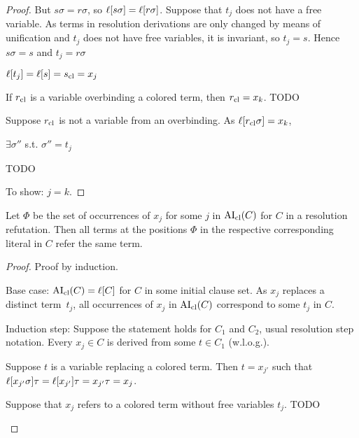\documentclass[,%
	paper=a4,%
	twoside=false,%
	liststotoc,
	bibtotoc,
	draft=false,%
	numbers=noendperiod
]{scrartcl}
\begin{document}
\begin{proof}
	But $s\sigma = r\sigma$, so $\ell[s\sigma] = \ell[r\sigma]$.
	Suppose that $t_j$ does not have a free variable.
	As terms in resolution derivations are only changed by means of unification and $t_j$ does not have free variables, it is invariant, so $t_j = s$.
	Hence $s\sigma = s$ and $t_j = r\sigma$

	$\ell[t_j] = \ell[s] = s_\mathrm{cl} = x_j$

	If $r_\mathrm{cl}$ is a variable overbinding a colored term, then $r_\mathrm{cl} = x_k$.  TODO

	Suppose $r_\mathrm{cl}$ is not a variable from an overbinding. As $\ell[r_\mathrm{cl} \sigma] = x_k$, 

	$\exists \sigma''$ s.t. $ \sigma'' = t_j$


	TODO

	To show: $j=k$.
\end{proof}

\begin{prop}
	Let $\Phi$ be the set of occurrences of $x_j$ for some $j$ in $\operatorname{AI}_\mathrm{cl}(C)$ for $C$ in a resolution refutation.
	Then all terms at the positions $\Phi$ in the respective corresponding literal in $C$ refer the same term.
\end{prop}
\begin{proof}
	Proof by induction.

	Base case: $\operatorname{AI}_\mathrm{cl}(C) = \ell[C]$ for $C$ in some initial clause set.
	As $x_j$ replaces a distinct term~$t_j$, all occurrences of $x_j$ in $\operatorname{AI}_\mathrm{cl}(C)$ correspond to some $t_j$ in $C$.

	Induction step:
	Suppose the statement holds for $C_1$ and $C_2$, usual resolution step notation.
	Every $x_j \in C$ is derived from some $t \in C_1$ (w.l.o.g.).
	\begin{compactitem}
	\item
		Suppose $t$ is a variable replacing a colored term.
		Then $t = x_{j'}$ such that $\ell[x_{j'}\sigma]\tau = \ell[x_{j'}]\tau = x_{j'}\tau = x_j$.

		Suppose that $x_j$ refers to a colored term without free variables $t_j$. 
		TODO
	\end{compactitem}

\end{proof}
\end{document}
